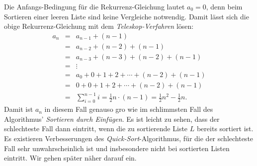 Die Anfangs-Bedingung f\"ur die Rekurrenz-Gleichung lautet $a_0 = 0$, denn beim Sortieren einer leeren Liste sind keine
Vergleiche notwendig.  Damit l\"asst sich die obige Rekurrenz-Gleichung mit dem \emph{Teleskop-Verfahren} l\"osen:
\[
\begin{array}{lcl}
  a_n & = & a_{n-1} + (n-1) \\
      & = & a_{n-2} + (n-2) + (n-1) \\
      & = & a_{n-3} + (n-3) + (n-2) + (n-1) \\
      & = & \vdots \\
      & = & a_{0} + 0 + 1 + 2 + \cdots  + (n-2) + (n-1) \\
      & = & 0 + 0 + 1 + 2 + \cdots  + (n-2) + (n-1) \\[0.2cm]
      & = & \sum\limits_{i=0}^{n-1} i  =  \frac{1}{2} n \cdot(n - 1) =\frac{1}{2} n^2 - \frac{1}{2} n.
\end{array}
\]
Damit ist $a_n$ in diesem Fall genauso gro\3 wie im schlimmsten Fall des Algorithmus'
\emph{Sortieren durch Einf\"ugen}. 
Es ist leicht zu sehen, dass der schlechteste Fall dann eintritt, wenn die zu sortierende Liste $L$
bereits sortiert ist.  Es existieren Verbesserungen des \emph{Quick-Sort}-Algorithmus, f\"ur
die der schlechteste Fall sehr unwahrscheinlich ist und insbesondere nicht bei sortierten
Listen eintritt.  Wir gehen sp\"ater n\"aher darauf ein. 


